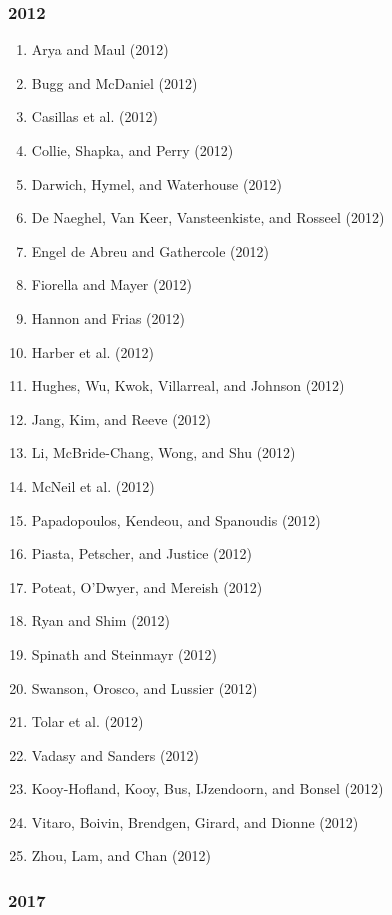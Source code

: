 \documentclass[english,man]{apa6}
\providecommand{\tightlist}{%
  \setlength{\itemsep}{0pt}\setlength{\parskip}{0pt}}
\begin{document}
\subsubsection{2012}\label{section-18}

\begin{enumerate}
\def\labelenumi{\arabic{enumi})}
\tightlist
\item
  Arya and Maul (2012)
\item
  Bugg and McDaniel (2012)
\item
  Casillas et al. (2012)
\item
  Collie, Shapka, and Perry (2012)
\item
  Darwich, Hymel, and Waterhouse (2012)
\item
  De Naeghel, Van Keer, Vansteenkiste, and Rosseel (2012)
\item
  Engel de Abreu and Gathercole (2012)
\item
  Fiorella and Mayer (2012)
\item
  Hannon and Frias (2012)
\item
  Harber et al. (2012)
\item
  Hughes, Wu, Kwok, Villarreal, and Johnson (2012)
\item
  Jang, Kim, and Reeve (2012)
\item
  Li, McBride-Chang, Wong, and Shu (2012)
\item
  McNeil et al. (2012)
\item
  Papadopoulos, Kendeou, and Spanoudis (2012)
\item
  Piasta, Petscher, and Justice (2012)
\item
  Poteat, O'Dwyer, and Mereish (2012)
\item
  Ryan and Shim (2012)
\item
  Spinath and Steinmayr (2012)
\item
  Swanson, Orosco, and Lussier (2012)
\item
  Tolar et al. (2012)
\item
  Vadasy and Sanders (2012)
\item
  Kooy-Hofland, Kooy, Bus, IJzendoorn, and Bonsel (2012)
\item
  Vitaro, Boivin, Brendgen, Girard, and Dionne (2012)
\item
  Zhou, Lam, and Chan (2012)
\end{enumerate}

\subsubsection{2017}\label{section-19}
\end{document}
